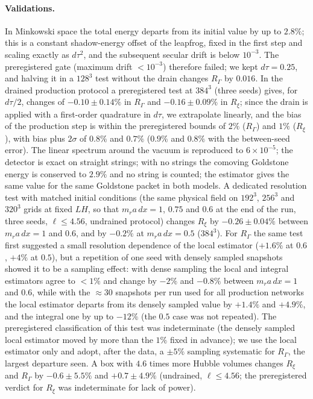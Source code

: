 \documentclass[prd,twocolumn,superscriptaddress,nofootinbib,amsmath,amssymb]{revtex4-2}
\newcommand{\RG}{R_\Gamma}
\newcommand{\Rxi}{R_\xi}
\begin{document}
\paragraph{Validations.}
In Minkowski space the total energy departs from its initial value by up to $2.8\%$; this is a constant shadow-energy offset of the leapfrog, fixed in the first step and scaling exactly as $d\tau^2$, and the subsequent secular drift is below $10^{-3}$. The preregistered gate (maximum drift $<10^{-3}$) therefore failed; we kept $d\tau=0.25$, and halving it in a $128^3$ test without the drain changes $\RG$ by $0.016$.
In the drained production protocol a preregistered test at $384^3$ (three seeds) gives, for $d\tau/2$, changes of $-0.10\pm0.14\%$ in $\RG$ and $-0.16\pm0.09\%$ in $\Rxi$; since the drain is applied with a first-order quadrature in $d\tau$, we extrapolate linearly, and the bias of the production step is within the preregistered bounds of $2\%$ ($\RG$) and $1\%$ ($\Rxi$), with bias plus $2\sigma$ of $0.8\%$ and $0.7\%$ ($0.9\%$ and $0.8\%$ with the between-seed error).
The linear spectrum around the vacuum is reproduced to $6\times10^{-5}$; the detector is exact on straight strings; with no strings the comoving Goldstone energy is conserved to $2.9\%$ and no string is counted; the estimator gives the same value for the same Goldstone packet in both models.
A dedicated resolution test with matched initial conditions (the same physical field on $192^3$, $256^3$ and $320^3$ grids at fixed $LH$, so that $m_r a\,dx=1$, $0.75$ and $0.6$ at the end of the run, three seeds, $\ell\le4.56$, undrained protocol) changes $\Rxi$ by $-0.26\pm0.04\%$ between $m_r a\,dx=1$ and $0.6$, and by $-0.2\%$ at $m_r a\,dx=0.5$ ($384^3$).
For $\RG$ the same test first suggested a small resolution dependence of the local estimator ($+1.6\%$ at $0.6$, $+4\%$ at $0.5$), but a repetition of one seed with densely sampled snapshots showed it to be a sampling effect: with dense sampling the local and integral estimators agree to $<1\%$ and change by $-2\%$ and $-0.8\%$ between $m_r a\,dx=1$ and $0.6$, while with the $\approx30$ snapshots per run used for all production networks the local estimator departs from its densely sampled value by $+1.4\%$ and $+4.9\%$, and the integral one by up to $-12\%$ (the $0.5$ case was not repeated).
The preregistered classification of this test was indeterminate (the densely sampled local estimator moved by more than the $1\%$ fixed in advance); we use the local estimator only and adopt, after the data, a $\pm5\%$ sampling systematic for $\RG$, the largest departure seen.
A box with $4.6$ times more Hubble volumes changes $\Rxi$ and $\RG$ by $-0.6\pm5.5\%$ and $+0.7\pm4.9\%$ (undrained, $\ell\le4.56$; the preregistered verdict for $\Rxi$ was indeterminate for lack of power).
\end{document}
